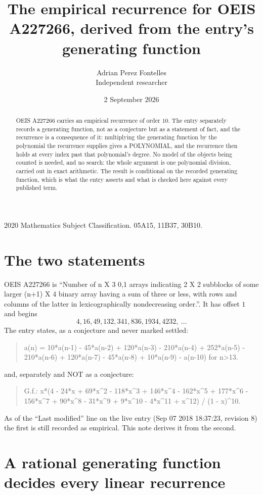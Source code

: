 \documentclass[11pt,a4paper]{article}
\title{The empirical recurrence for OEIS A227266, derived from the entry's generating function}
\author{Adrian Perez Fontelles\\ \small Independent researcher}
\date{2 September 2026}
\theoremstyle{plain}
\theoremstyle{definition}
\begin{document}
\maketitle

\begin{abstract}
OEIS A227266 carries an empirical recurrence of order $10$. The entry separately records a
generating function, not as a conjecture but as a statement of fact, and the recurrence is a
consequence of it: multiplying the generating function by the polynomial the recurrence
supplies gives a POLYNOMIAL, and the recurrence then holds at every index past that
polynomial's degree. No model of the objects being counted is needed, and no search: the
whole argument is one polynomial division, carried out in exact arithmetic. The result is
conditional on the recorded generating function, which is what the entry asserts and what is
checked here against every published term.
\end{abstract}

\noindent\small 2020 Mathematics Subject Classification. 05A15, 11B37, 30B10.\normalsize

\section{The two statements}

OEIS A227266 is ``Number of n X 3 0,1 arrays indicating 2 X 2 subblocks of some larger (n+1) X 4 binary array having a sum of three or less, with rows and columns of the latter in lexicographically nondecreasing order.''. It has offset $1$ and begins
\[
4, 16, 49, 132, 341, 836, 1934, 4232,\ \dots
\]
The entry states, as a conjecture and never marked settled:
\begin{quote}
a(n) = 10*a(n-1) - 45*a(n-2) + 120*a(n-3) - 210*a(n-4) + 252*a(n-5) - 210*a(n-6) + 120*a(n-7) - 45*a(n-8) + 10*a(n-9) - a(n-10) for n>13.
\end{quote}
and, separately and NOT as a conjecture:
\begin{quote}
G.f.: x*(4 - 24*x + 69*x\^{}2 - 118*x\^{}3 + 146*x\^{}4 - 162*x\^{}5 + 177*x\^{}6 - 156*x\^{}7 + 90*x\^{}8 - 31*x\^{}9 + 9*x\^{}10 - 4*x\^{}11 + x\^{}12) / (1 - x)\^{}10.
\end{quote}
As of the ``Last modified'' line on the live entry (Sep 07 2018 18:37:23, revision 8) the first is still
recorded as empirical. This note derives it from the second.

\section{A rational generating function decides every linear recurrence}
\end{document}
